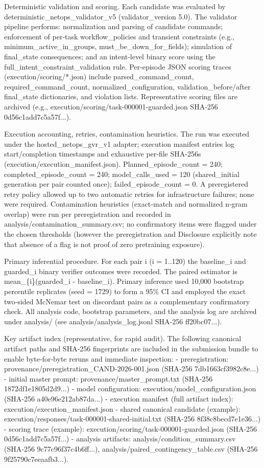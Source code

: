\documentclass[conference]{IEEEtran}
\begin{document}
Deterministic validation and scoring. Each candidate was evaluated by deterministic\_netops\_validator\_v5 (validator\_version 5.0). The validator pipeline performs: normalization and parsing of candidate commands; enforcement of per‑task workflow\_policies and transient constraints (e.g., minimum\_active\_in\_groups, must\_be\_down\_for\_fields); simulation of final\_state consequences; and an intent‑level binary score using the full\_intent\_constraint\_validation rule. Per‑episode JSON scoring traces (execution/scoring/*.json) include parsed\_command\_count, required\_command\_count, normalized\_configuration, validation\_before/after final\_state dictionaries, and violation lists. Representative scoring files are archived (e.g., execution/scoring/task-000001-guarded.json SHA‑256 0d56c1add7c5a57f...).

Execution accounting, retries, contamination heuristics. The run was executed under the hosted\_netops\_gvr\_v1 adapter; execution manifest entries log start/completion timestamps and exhaustive per‑file SHA‑256s (execution/execution\_manifest.json). Planned\_episode\_count = 240; completed\_episode\_count = 240; model\_calls\_used = 120 (shared\_initial generation per pair counted once); failed\_episode\_count = 0. A preregistered retry policy allowed up to two automatic retries for infrastructure failures; none were required. Contamination heuristics (exact‑match and normalized n‑gram overlap) were run per preregistration and recorded in analysis/contamination\_summary.csv; no confirmatory items were flagged under the chosen thresholds (however the preregistration and Disclosure explicitly note that absence of a flag is not proof of zero pretraining exposure).

Primary inferential procedure. For each pair i (i = 1..120) the baseline\_i and guarded\_i binary verifier outcomes were recorded. The paired estimator is mean\_\{i\}(guarded\_i - baseline\_i). Primary inference used 10,000 bootstrap percentile replicates (seed = 1729) to form a 95\% CI and employed the exact two‑sided McNemar test on discordant pairs as a complementary confirmatory check. All analysis code, bootstrap parameters, and the analysis log are archived under analysis/ (see analysis/analysis\_log.jsonl SHA‑256 ff20bc07...).

Key artifact index (representative, for rapid audit). The following canonical artifact paths and SHA‑256 fingerprints are included in the submission bundle to enable byte‑for‑byte reruns and immediate inspection:
- preregistration: provenance/preregistration\_CAND-2026-001.json (SHA‑256 7db1663cf3982c8e...)
- initial master prompt: provenance/master\_prompt.txt (SHA‑256 1872df1e1805d2d9...)
- model configuration: execution/model\_configuration.json (SHA‑256 a40e96e212ab87da...)
- execution manifest (full artifact index): execution/execution\_manifest.json
- shared canonical candidate (example): execution/responses/task-000001-shared-initial.txt (SHA‑256 8f38c8becd7e1e36...)
- scoring trace (example): execution/scoring/task-000001-guarded.json (SHA‑256 0d56c1add7c5a57f...)
- analysis artifacts: analysis/condition\_summary.csv (SHA‑256 9c77c96f37c4b6ff...), analysis/paired\_contingency\_table.csv (SHA‑256 9f25790c7eeaafb3...).
\end{document}
